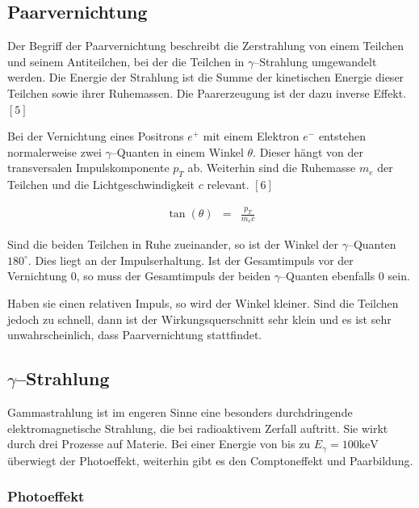 \documentclass[12pt,a4paper]{scrartcl}
\numberwithin{equation}{section} %
\newcommand{\pu}[1]{\ensuremath{\mathrm{#1}}}
\renewcommand{\[}{} %
\renewcommand{\]}{\noindent} %
\begin{document}
\hypertarget{paarvernichtung}{%
\subsection{Paarvernichtung}\label{paarvernichtung}}

Der Begriff der Paarvernichtung beschreibt die Zerstrahlung von einem
Teilchen und seinem Antiteilchen, bei der die Teilchen in
\(\gamma\)--Strahlung umgewandelt werden. Die Energie der Strahlung ist
die Summe der kinetischen Energie dieser Teilchen sowie ihrer
Ruhemassen. Die Paarerzeugung ist der dazu inverse Effekt. \([5]\)

Bei der Vernichtung eines Positrons \(e^+\) mit einem Elektron \(e^-\)
entstehen normalerweise zwei \(\gamma\)--Quanten in einem Winkel
\(\theta\). Dieser hängt von der transversalen Impulskomponente \(p_T\)
ab. Weiterhin sind die Ruhemasse \(m_e\) der Teilchen und die
Lichtgeschwindigkeit \(c\) relevant. \([6]\)

\[
\begin{eqnarray}
    \tan(\theta) &=& \frac{p_T}{m_ec}
\end{eqnarray}
\]

Sind die beiden Teilchen in Ruhe zueinander, so ist der Winkel der
\(\gamma\)--Quanten \(\pu{180^\circ}\). Dies liegt an der
Impulserhaltung. Ist der Gesamtimpuls vor der Vernichtung \(0\), so muss
der Gesamtimpuls der beiden \(\gamma\)--Quanten ebenfalls \(0\) sein.

Haben sie einen relativen Impuls, so wird der Winkel kleiner. Sind die
Teilchen jedoch zu schnell, dann ist der Wirkungsquerschnitt sehr klein
und es ist sehr unwahrscheinlich, dass Paarvernichtung stattfindet.

\hypertarget{gammastrahlung}{%
\subsection{\texorpdfstring{\(\gamma\)--Strahlung}{\textbackslash gamma--Strahlung}}\label{gammastrahlung}}

Gammastrahlung ist im engeren Sinne eine besonders durchdringende
elektromagnetische Strahlung, die bei radioaktivem Zerfall auftritt. Sie
wirkt durch drei Prozesse auf Materie. Bei einer Energie von bis zu
\(E_\gamma = \pu{100 keV}\) überwiegt der Photoeffekt, weiterhin gibt es
den Comptoneffekt und Paarbildung.

\hypertarget{photoeffekt}{%
\subsubsection{Photoeffekt}\label{photoeffekt}}
\end{document}
